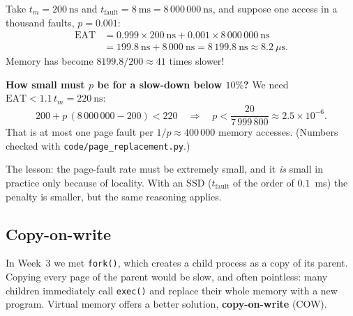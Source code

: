 \documentclass[11pt,a4paper]{article}
\newcommand{\term}[1]{\textbf{\color{mintdeep}#1}}
\newcommand{\cmd}[1]{\texttt{#1}}
\begin{document}
\begin{example}
Take $t_m = 200\ \text{ns}$ and $t_{\text{fault}} = 8\ \text{ms} = 8\,000\,000\ \text{ns}$, and suppose one access in a thousand faults, $p = 0.001$:
\begin{align*}
\text{EAT} &= 0.999 \times 200\ \text{ns} + 0.001 \times 8\,000\,000\ \text{ns} \\
           &= 199.8\ \text{ns} + 8\,000\ \text{ns} = 8\,199.8\ \text{ns} \approx 8.2\ \mu\text{s}.
\end{align*}
Memory has become $8199.8/200 \approx 41$ times slower!

\textbf{How small must $p$ be for a slow-down below $10\%$?} We need $\text{EAT} < 1.1\, t_m = 220\ \text{ns}$:
\[
200 + p\,(8\,000\,000 - 200) < 220
\quad\Longrightarrow\quad
p < \frac{20}{7\,999\,800} \approx 2.5 \times 10^{-6}.
\]
That is at most one page fault per $1/p \approx 400\,000$ memory accesses. (Numbers checked with \cmd{code/page\_replacement.py}.)
\end{example}

The lesson: the page-fault rate must be extremely small, and it \emph{is} small in practice only because of locality. With an SSD ($t_{\text{fault}}$ of the order of $0.1$~ms) the penalty is smaller, but the same reasoning applies.

\subsection{Copy-on-write}
\label{sec:cow}

In Week~3 we met \cmd{fork()}, which creates a child process as a copy of its parent. Copying every page of the parent would be slow, and often pointless: many children immediately call \cmd{exec()} and replace their whole memory with a new program. Virtual memory offers a better solution, \term{copy-on-write} (COW).
\end{document}
